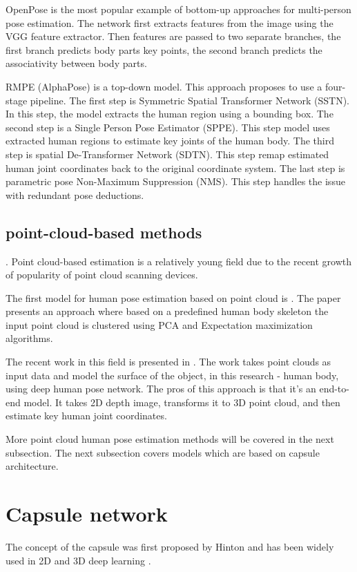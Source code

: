OpenPose \parencite{cao_openpose_2019} is the most popular example of bottom-up approaches for multi-person pose estimation. The network first extracts features from the image using the VGG feature extractor. Then features are passed to two separate branches, the first branch predicts body parts key points, the second branch predicts the associativity between body parts.

RMPE (AlphaPose) \parencite{fang_rmpe_2018} is a top-down model.
This approach proposes to use a four-stage pipeline. The first step is Symmetric Spatial Transformer Network (SSTN). In this step, the model extracts the human region using a bounding box. The second step is a Single Person Pose Estimator (SPPE). This step model uses extracted human regions to estimate key joints of the human body. The third step is spatial De-Transformer Network (SDTN). This step remap estimated human joint coordinates back to the original coordinate system. The last step is parametric pose Non-Maximum Suppression (NMS). This step handles the issue with redundant pose deductions.

\subsection{point-cloud-based methods}. Point cloud-based estimation is a relatively young field due to the recent growth of popularity of point cloud scanning devices.

The first model for human pose estimation based on point cloud is \parencite{diaz_barros_real-time_2015}. The paper presents an approach where based on a predefined human body skeleton the input point cloud is clustered using PCA and Expectation maximization algorithms.

The recent work in this field is presented in \parencite{zhou_learning_2020}. The work takes point clouds as input data and model the surface of the object, in this research - human body, using deep human pose network. The pros of this approach is that it's an end-to-end model. It takes 2D depth image, transforms it to 3D point cloud, and then estimate key human joint coordinates.

More point cloud human pose estimation methods will be covered in the next subsection. The next subsection covers models which are based on capsule architecture.

\section{Capsule network}
\label{Capsule network}
The concept of the capsule was first proposed by Hinton \parencite{sabour_dynamic_2017} and has been widely used in 2D and 3D deep learning \parencite{kakillioglu_3d_2020, qin_detecting_2020, duarte_videocapsulenet_2018, lalonde_capsules_2018}.

